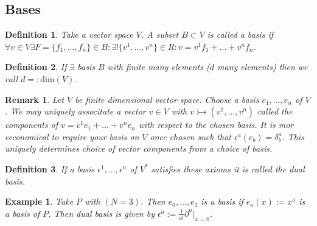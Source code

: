 \documentclass[10pt, oneside]{article}
\newtheorem{defn}{Definition}
\newtheorem{example}{Example}
\newtheorem{remark}{Remark}
\begin{document}
      \subsection*{Bases}
         \begin{defn}
            Take a vector space $V$. A subset $B \subset V$ is called a basis if $\forall v \in V \exists F=\{f_1, ..., f_n\} \in B : \exists ! \{v^1, ..., v^n\} \in R : v = v^1 f_1 + ... + v^n f_n$.
         \end{defn}
         \begin{defn}
            If $\exists$ basis $B$ with finite many elements ($d$ many elements) then we call $d =: \text{dim}(V)$.
         \end{defn}
         \begin{remark}
            Let $V$ be finite dimensional vector space. Choose a basis $e_1, ..., e_n$ of $V$. We may uniquely associtate a vector $v \in V$ with $v \rightarrowtail (v^1,...,v^n)$ called the components of $v=v^1e_1+...+v^ne_n$ with respect to the chosen basis.
            It is mor eeconomical to require your basis on $V$ once chosen such that $\epsilon^a (e_b) = \delta^a_b$. This uniquely determines choice of vector components from a choice of basis. 
         \end{remark}
         \begin{defn}
            If a basis $\epsilon^1,...,\epsilon^n$ of $V^*$ satisfies these axioms it is called the dual basis.
         \end{defn}
         \begin{example}
            Take $P$ with $(N=3)$. Then $e_0,...,e_3$ is a basis if $e_a (x) := x^a$ is a basis of $P$. Then dual basis is given by $\epsilon^a := \frac{1}{a!} \partial^a |_{x=0}$.
         \end{example}
\end{document}
